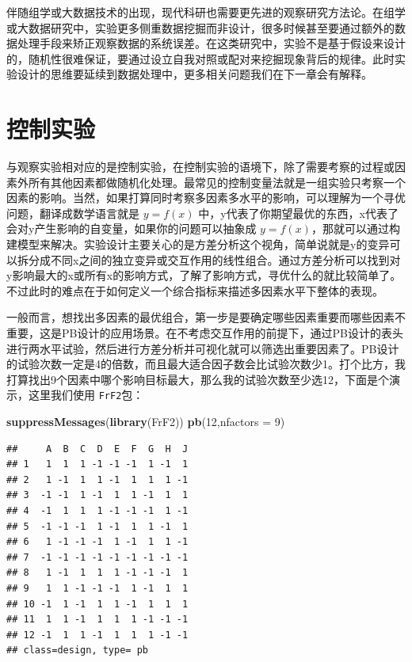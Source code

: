 \documentclass[]{tufte-book}
\newenvironment{Shaded}{}{}
\newcommand{\DataTypeTok}[1]{\textcolor[rgb]{0.56,0.13,0.00}{#1}}
\newcommand{\DecValTok}[1]{\textcolor[rgb]{0.25,0.63,0.44}{#1}}
\newcommand{\KeywordTok}[1]{\textcolor[rgb]{0.00,0.44,0.13}{\textbf{#1}}}
\newcommand{\NormalTok}[1]{#1}
\begin{document}
伴随组学或大数据技术的出现，现代科研也需要更先进的观察研究方法论。在组学或大数据研究中，实验更多侧重数据挖掘而非设计，很多时候甚至要通过额外的数据处理手段来矫正观察数据的系统误差。在这类研究中，实验不是基于假设来设计的，随机性很难保证，要通过设立自我对照或配对来挖掘现象背后的规律。此时实验设计的思维要延续到数据处理中，更多相关问题我们在下一章会有解释。

\hypertarget{ux63a7ux5236ux5b9eux9a8c}{%
\section{控制实验}\label{ux63a7ux5236ux5b9eux9a8c}}

与观察实验相对应的是控制实验，在控制实验的语境下，除了需要考察的过程或因素外所有其他因素都做随机化处理。最常见的控制变量法就是一组实验只考察一个因素的影响。当然，如果打算同时考察多因素多水平的影响，可以理解为一个寻优问题，翻译成数学语言就是 \(y = f(x)\) 中，y代表了你期望最优的东西，x代表了会对y产生影响的自变量，如果你的问题可以抽象成 \(y = f(x)\)，那就可以通过构建模型来解决。实验设计主要关心的是方差分析这个视角，简单说就是y的变异可以拆分成不同x之间的独立变异或交互作用的线性组合。通过方差分析可以找到对y影响最大的x或所有x的影响方式，了解了影响方式，寻优什么的就比较简单了。不过此时的难点在于如何定义一个综合指标来描述多因素水平下整体的表现。

一般而言，想找出多因素的最优组合，第一步是要确定哪些因素重要而哪些因素不重要，这是PB设计的应用场景。在不考虑交互作用的前提下，通过PB设计的表头进行两水平试验，然后进行方差分析并可视化就可以筛选出重要因素了。PB设计的试验次数一定是4的倍数，而且最大适合因子数会比试验次数少1。打个比方，我打算找出9个因素中哪个影响目标最大，那么我的试验次数至少选12，下面是个演示，这里我们使用 \texttt{FrF2}包：

\begin{Shaded}
\begin{Highlighting}[]
\KeywordTok{suppressMessages}\NormalTok{(}\KeywordTok{library}\NormalTok{(FrF2))}
\KeywordTok{pb}\NormalTok{(}\DecValTok{12}\NormalTok{,}\DataTypeTok{nfactors =} \DecValTok{9}\NormalTok{)}
\end{Highlighting}
\end{Shaded}

\begin{verbatim}
##     A  B  C  D  E  F  G  H  J
## 1   1  1  1 -1 -1 -1  1 -1  1
## 2   1 -1  1  1 -1  1  1  1 -1
## 3  -1 -1  1 -1  1  1 -1  1  1
## 4  -1  1  1  1 -1 -1 -1  1 -1
## 5  -1 -1 -1  1 -1  1  1 -1  1
## 6   1 -1 -1 -1  1 -1  1  1 -1
## 7  -1 -1 -1 -1 -1 -1 -1 -1 -1
## 8   1 -1  1  1  1 -1 -1 -1  1
## 9   1  1 -1 -1 -1  1 -1  1  1
## 10 -1  1 -1  1  1 -1  1  1  1
## 11  1  1 -1  1  1  1 -1 -1 -1
## 12 -1  1  1 -1  1  1  1 -1 -1
## class=design, type= pb
\end{verbatim}
\end{document}
